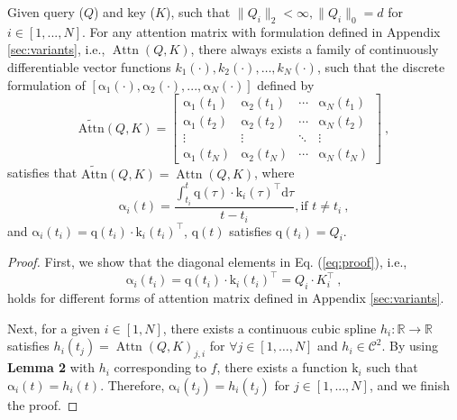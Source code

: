 \begin{theorem}
Given query ($Q$) and key ($K$), such that $\|Q_i\|_2 < \infty, \|Q_i\|_0 = d$ for $i \in [1, ..., N]$.
For any attention matrix with formulation defined in Appendix \ref{sec:variants}, i.e., $\operatorname{Attn}(Q, K)$, there always exists a family of continuously differentiable vector functions $k_1(\cdot), k_2(\cdot), \ldots, k_N(\cdot)$, such that the discrete formulation of $[\boldsymbol{\mathrm{\alpha}}_1(\cdot), \boldsymbol{\mathrm{\alpha}}_2(\cdot), ..., \boldsymbol{\mathrm{\alpha}}_N(\cdot)]$ defined by
\begin{equation}
\operatorname{\widetilde{Attn}}(Q, K)=\left[\begin{array}{cccc}
\boldsymbol{\mathrm{\alpha}}_1(t_1) & \boldsymbol{\mathrm{\alpha}}_2(t_1) & \cdots & \boldsymbol{\mathrm{\alpha}}_N(t_1) \\
\boldsymbol{\mathrm{\alpha}}_1(t_2) & \boldsymbol{\mathrm{\alpha}}_2(t_2) & \cdots & \boldsymbol{\mathrm{\alpha}}_N(t_2) \\
\vdots & \vdots & \ddots & \vdots \\
\boldsymbol{\mathrm{\alpha}}_1(t_N) & \boldsymbol{\mathrm{\alpha}}_2(t_N) & \cdots & \boldsymbol{\mathrm{\alpha}}_N(t_N)
\end{array}\right] ~,
\label{eq:proof}
\end{equation}
satisfies that $\operatorname{\widetilde{Attn}}(Q, K) = \operatorname{Attn}(Q, K)$, where 
\begin{equation}
\boldsymbol{\mathrm{\alpha}}_i(t) = 
\frac{\int_{t_i}^t \boldsymbol{\mathrm{q}}(\tau) \cdot \boldsymbol{\mathrm{k}}_i(\tau)^\top \text{d} \tau}{t-t_i} ,  \text{if } t \neq t_i ~,
\end{equation} 
and $\boldsymbol{\mathrm{\alpha}}_i(t_i) = \boldsymbol{\mathrm{q}}(t_i) \cdot \boldsymbol{\mathrm{k}}_i(t_i)^\top$, $\boldsymbol{\mathrm{q}}(t)$ satisfies $\boldsymbol{\mathrm{q}}(t_i)=Q_i$.
\end{theorem}

\begin{proof}
First, we show that the diagonal elements in Eq. (\ref{eq:proof}), i.e., 
\begin{equation}
    \boldsymbol{\mathrm{\alpha}}_i(t_i) = \boldsymbol{\mathrm{q}}(t_i) \cdot \boldsymbol{\mathrm{k}}_i(t_i)^\top = Q_i \cdot K_i^\top ~,
\end{equation}
holds for different forms of attention matrix defined in Appendix \ref{sec:variants}.

Next, for a given $i \in [1, N]$, there exists a continuous cubic spline $h_i: \mathbb{R} \rightarrow \mathbb{R}$ satisfies $h_i(t_j)=\operatorname{Attn}(Q, K)_{j, i}$ for $\forall j \in [1, \ldots, N]$ and $h_i \in \mathcal{C}^2$. By using \textbf{Lemma 2} with $h_i$ corresponding to $f$, there exists a function $\boldsymbol{\mathrm{k}}_i$ such that $\boldsymbol{\mathrm{\alpha}}_i(t) = h_i(t)$. Therefore, $\boldsymbol{\mathrm{\alpha}}_i(t_j) = h_i(t_j)$ for $j \in [1, ..., N]$, and we finish the proof.
\end{proof}

